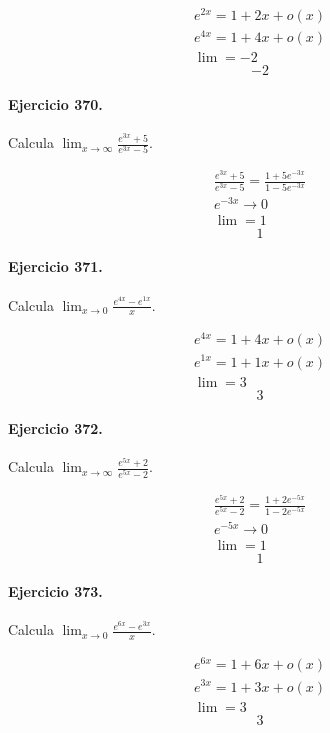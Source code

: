\documentclass[11pt,a4paper]{article}
\begin{document}
\[
\begin{aligned}
e^{2x}=1+2x+o(x)\\
e^{4x}=1+4x+o(x)\\
\lim=-2
\end{aligned}
\]
\[\boxed{-2}\]


\paragraph{Ejercicio 370.} Calcula $\displaystyle\lim_{x\to\infty}\frac{e^{3x}+5}{e^{3x}-5}$.

\[
\begin{aligned}
\frac{e^{3x}+5}{e^{3x}-5}=\frac{1+5e^{-3x}}{1-5e^{-3x}}\\
e^{-3x}\to0\\
\lim=1
\end{aligned}
\]
\[\boxed{1}\]


\paragraph{Ejercicio 371.} Calcula $\displaystyle\lim_{x\to0}\frac{e^{4x}-e^{1x}}{x}$.

\[
\begin{aligned}
e^{4x}=1+4x+o(x)\\
e^{1x}=1+1x+o(x)\\
\lim=3
\end{aligned}
\]
\[\boxed{3}\]


\paragraph{Ejercicio 372.} Calcula $\displaystyle\lim_{x\to\infty}\frac{e^{5x}+2}{e^{5x}-2}$.

\[
\begin{aligned}
\frac{e^{5x}+2}{e^{5x}-2}=\frac{1+2e^{-5x}}{1-2e^{-5x}}\\
e^{-5x}\to0\\
\lim=1
\end{aligned}
\]
\[\boxed{1}\]


\paragraph{Ejercicio 373.} Calcula $\displaystyle\lim_{x\to0}\frac{e^{6x}-e^{3x}}{x}$.

\[
\begin{aligned}
e^{6x}=1+6x+o(x)\\
e^{3x}=1+3x+o(x)\\
\lim=3
\end{aligned}
\]
\[\boxed{3}\]
\end{document}
